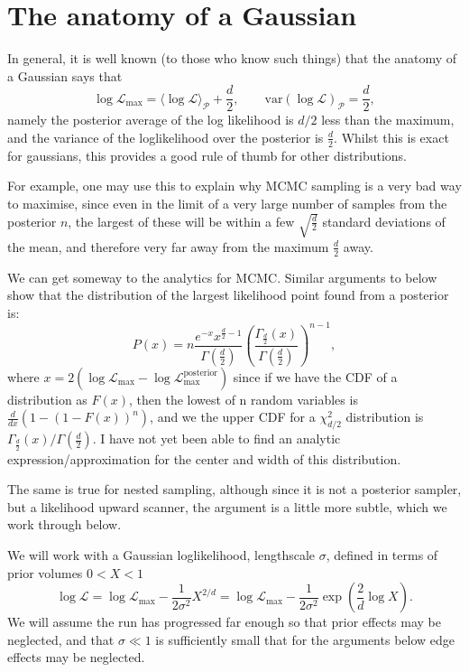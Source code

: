 \documentclass[usenatbib]{mnras}
\begin{document}
\section{The anatomy of a Gaussian}

In general, it is well known (to those who know such things) that the anatomy of a Gaussian says that
\begin{equation}
    \boxed{\log\mathcal{L}_\mathrm{max} = \langle\log\mathcal{L}\rangle_\mathcal{P} + \frac{d}{2}},  \qquad \boxed{\mathrm{var}(\log\mathcal{L})_\mathcal{P} = \frac{d}{2}},
\end{equation}
namely the posterior average of the log likelihood is $d/2$ less than the maximum, and the variance of the loglikelihood over the posterior is $\frac{d}{2}$. Whilst this is exact for gaussians, this provides a good rule of thumb for other distributions. 

For example, one may use this to explain why MCMC sampling is a very bad way to maximise, since even in the limit of a very large number of samples from the posterior $n$, the largest of these will be within a few $\sqrt{\frac{d}{2}}$ standard deviations of the mean, and therefore very far away from the maximum $\frac{d}{2}$ away.

We can get someway to the analytics for MCMC. Similar arguments to below show that the distribution of the largest likelihood point found from a posterior is:
\begin{equation}
    P(x) = n \frac{e^{-x} x^{\frac{d}{2}-1} }{\Gamma\left(\frac{d}{2}\right)} {\left( \frac{\Gamma_{\frac{d}{2}}(x)}{\Gamma(\frac{d}{2})} \right)}^{n-1},
\end{equation}
where $x=2(\log\mathcal{L}_\mathrm{max}-\log\mathcal{L}_\mathrm{max}^\mathrm{posterior})$
since if we have the CDF of a distribution as $F(x)$, then the lowest of n random variables is $\frac{d}{dx}( 1- (1-F(x))^n)$, and we the upper CDF for a $\chi^2_{d/2}$ distribution is $\Gamma_{\frac{d}{2}}(x)/\Gamma(\frac{d}{2})$. I have not yet been able to find an analytic expression/approximation for the center and width of this distribution.

The same is true for nested sampling, although since it is not a posterior sampler, but a likelihood upward scanner, the argument is a little more subtle, which we work through below.



We will work with a Gaussian loglikelihood, lengthscale $\sigma$, defined in terms of prior volumes $0<X<1$
\begin{equation}
    \log\mathcal{L}
    =\log\mathcal{L}_\mathrm{max} - \frac{1}{2\sigma^2}X^{2/d}
    =\log\mathcal{L}_\mathrm{max} - \frac{1}{2\sigma^2}\exp\left(\frac{2}{d}\log X\right).
    \label{eq:LX}
\end{equation}
We will assume the run has progressed far enough so that prior effects may be neglected, and that $\sigma\ll 1$ is sufficiently small that for the arguments below edge effects may be neglected.
\end{document}
